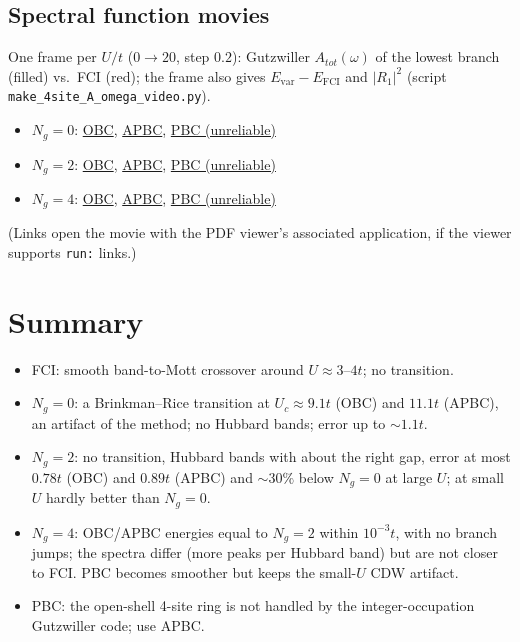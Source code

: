 \documentclass[11pt]{article}
\newcommand{\Ng}{N_{g}}
\newcommand{\Evar}{E_{\mathrm{var}}}
\newcommand{\EFCI}{E_{\mathrm{FCI}}}
\begin{document}
\subsection{Spectral function movies}

One frame per $U/t$ ($0\to20$, step $0.2$): Gutzwiller $A_{tot}(\omega)$ of the lowest branch (filled) vs.\ FCI (red);
the frame also gives $\Evar-\EFCI$ and $|R_1|^2$ (script \texttt{make\_4site\_A\_omega\_video.py}).
\begin{itemize}[nosep]
  \item $\Ng=0$: \href{run:../scan_4site_ng0/obc/A_omega_vs_U.mp4}{OBC},
        \href{run:../scan_4site_ng0/apbc/A_omega_vs_U.mp4}{APBC},
        \href{run:../scan_4site_ng0/pbc/A_omega_vs_U.mp4}{PBC (unreliable)}
  \item $\Ng=2$: \href{run:../scan_4site_ng2/obc/A_omega_vs_U.mp4}{OBC},
        \href{run:../scan_4site_ng2/apbc/A_omega_vs_U.mp4}{APBC},
        \href{run:../scan_4site_ng2/pbc/A_omega_vs_U.mp4}{PBC (unreliable)}
  \item $\Ng=4$: \href{run:../scan_4site_ng4/obc/A_omega_vs_U.mp4}{OBC},
        \href{run:../scan_4site_ng4/apbc/A_omega_vs_U.mp4}{APBC},
        \href{run:../scan_4site_ng4/pbc/A_omega_vs_U.mp4}{PBC (unreliable)}
\end{itemize}
\noindent (Links open the movie with the PDF viewer's associated application, if the viewer supports \texttt{run:} links.)

\section{Summary}
\label{sec:summary}

\begin{itemize}[nosep]
  \item FCI: smooth band-to-Mott crossover around $U\approx3$--$4t$; no transition.
  \item $\Ng=0$: a Brinkman--Rice transition at $U_c\approx9.1t$ (OBC) and $11.1t$ (APBC), an artifact of the method;
        no Hubbard bands; error up to $\sim1.1t$.
  \item $\Ng=2$: no transition, Hubbard bands with about the right gap, error at most $0.78t$ (OBC) and
        $0.89t$ (APBC) and $\sim30\%$ below $\Ng=0$ at large $U$; at small $U$ hardly better than $\Ng=0$.
  \item $\Ng=4$: OBC/APBC energies equal to $\Ng=2$ within $10^{-3}t$, with no branch jumps; the spectra differ
        (more peaks per Hubbard band) but are not closer to FCI. PBC becomes smoother but keeps the small-$U$ CDW artifact.
  \item PBC: the open-shell 4-site ring is not handled by the integer-occupation Gutzwiller code; use APBC.
\end{itemize}
\end{document}

